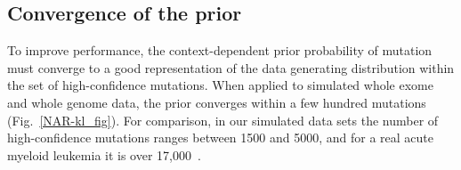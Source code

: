 \documentclass[a4,center,fleqn]{NAR}
\begin{document}
\subsection{Convergence of the prior}
To improve performance, the context-dependent prior probability of mutation must converge to a good representation of the data generating distribution within the set of high-confidence mutations.
When applied to simulated whole exome and whole genome data, the prior converges within a few hundred mutations (Fig.~\ref{NAR-kl_fig}).
For comparison, in our simulated data sets the number of high-confidence mutations ranges between 1500 and 5000, and for a real acute myeloid leukemia it is over 17,000~\cite{Griffith2015}.

\end{document}
